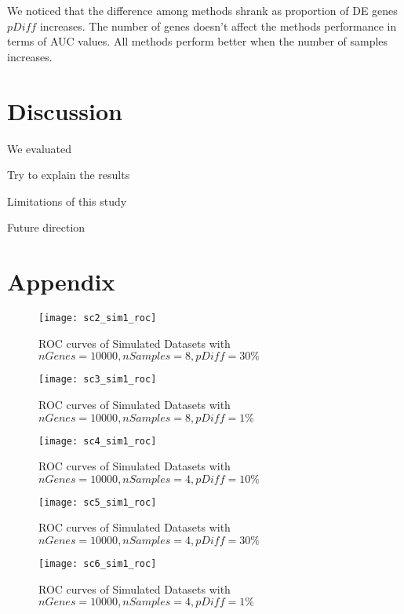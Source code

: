We noticed that the difference among methods shrank as proportion of DE genes $pDiff$ increases. The number of genes doesn't affect the methods performance in terms of AUC values. All methods perform better when the number of samples increases. 


\section{Discussion}

We evaluated

Try to explain the results

Limitations of this study

Future direction





\section{Appendix}

\begin{figure}[h!tb] 
\texttt{[image: sc2\_sim1\_roc]}
\caption{ROC curves of Simulated Datasets with $nGenes=10000, nSamples=8, pDiff=30\%$}
\label{sc2_roc}
\end{figure}

\begin{figure}[h!tb] 
\texttt{[image: sc3\_sim1\_roc]}
\caption{ROC curves of Simulated Datasets with $nGenes=10000, nSamples=8, pDiff=1\%$}
\label{sc3_roc}
\end{figure}


\begin{figure}[h!tb] 
\texttt{[image: sc4\_sim1\_roc]}
\caption{ROC curves of Simulated Datasets with $nGenes=10000, nSamples=4, pDiff=10\%$}
\label{sc4_roc}
\end{figure}


\begin{figure}[h!tb] 
\texttt{[image: sc5\_sim1\_roc]}
\caption{ROC curves of Simulated Datasets with $nGenes=10000, nSamples=4, pDiff=30\%$}
\label{sc5_roc}
\end{figure}


\begin{figure}[h!tb] 
\texttt{[image: sc6\_sim1\_roc]}
\caption{ROC curves of Simulated Datasets with $nGenes=10000, nSamples=4, pDiff=1\%$}
\label{sc6_roc}
\end{figure}


